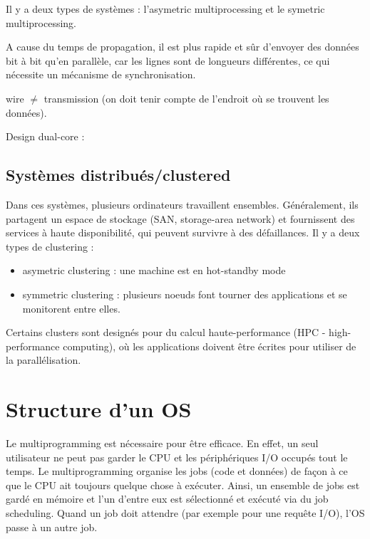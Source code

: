 	
	Il y a deux types de systèmes : l'asymetric multiprocessing et le symetric multiprocessing.
	
	
	A cause du temps de propagation, il est plus rapide et sûr d'envoyer des données bit à bit qu'en parallèle, car les lignes sont de longueurs différentes, ce qui nécessite un mécanisme de synchronisation.
	
	wire $\neq$ transmission (on doit tenir compte de l'endroit où se trouvent les données).
	
	Design dual-core :
		
	
		\subsection{Systèmes distribués/clustered}
		
		Dans ces systèmes, plusieurs ordinateurs travaillent ensembles. Généralement, ils partagent un espace de stockage (SAN, storage-area network) et fournissent des services à haute disponibilité, qui peuvent survivre à des défaillances. Il y a deux types de clustering :
		
		\begin{itemize}
			\item asymetric clustering : une machine est en hot-standby mode
			\item symmetric clustering : plusieurs noeuds font tourner des applications et se monitorent entre elles.
		\end{itemize}
		
		Certains clusters sont designés pour du calcul haute-performance (HPC - high-performance computing), où les applications doivent être écrites pour utiliser de la parallélisation.
		
	\section{Structure d'un OS}
	
	Le multiprogramming est nécessaire pour être efficace. En effet, un seul utilisateur ne peut pas garder le CPU et les périphériques I/O occupés tout le temps. Le multiprogramming organise les jobs (code et données) de façon à ce que le CPU ait toujours quelque chose à exécuter. Ainsi, un ensemble de jobs est gardé en mémoire et l'un d'entre eux est sélectionné et exécuté via du job scheduling. Quand un job doit attendre (par exemple pour une requête I/O), l'OS passe à un autre job.
	
